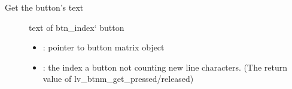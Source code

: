 \documentclass[letterpaper,10pt,english]{sphinxmanual}
\begin{document}

\begin{fulllineitems}
\label{\detokenize{object-types/btnm:_CPPv420lv_btnm_get_btn_textPK8lv_obj_t8uint16_t}}%
\pysigstartmultiline
{}\label{\detokenize{object-types/btnm:lv__btnm_8h_1a5adadb5024d6d28d34cbe8d35113ab92}}%
\pysigstopmultiline
Get the button’s text \begin{description}
\item[{}] \leavevmode
text of btn\_index{}` button 

\item[{}] \leavevmode\begin{itemize}
\item {} 
: pointer to button matrix object 

\item {} 
: the index a button not counting new line characters. (The return value of lv\_btnm\_get\_pressed/released) 

\end{itemize}

\end{description}


\end{fulllineitems}

\end{document}
